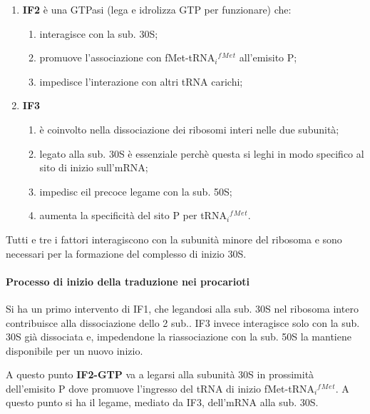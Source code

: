 \documentclass[]{article}
\begin{document}
\begin{enumerate}
\def\labelenumi{\arabic{enumi}.}
\setcounter{enumi}{1}
\itemsep1pt\parskip0pt
\item
  \textbf{IF2} è una GTPasi (lega e idrolizza GTP per funzionare) che:

  \begin{enumerate}
  \def\labelenumii{\arabic{enumii}.}
  \itemsep1pt\parskip0pt
  \item
    interagisce con la sub. 30S;
  \item
    promuove l'associazione con fMet-tRNA\(_i\)\(^f\)\(^M\)\(^e\)\(^t\)
    all'emisito P;
  \item
    impedisce l'interazione con altri tRNA carichi;
  \end{enumerate}
\item
  \textbf{IF3}

  \begin{enumerate}
  \def\labelenumii{\arabic{enumii}.}
  \itemsep1pt\parskip0pt
  \item
    è coinvolto nella dissociazione dei ribosomi interi nelle due
    subunità;
  \item
    legato alla sub. 30S è essenziale perchè questa si leghi in modo
    specifico al sito di inizio sull'mRNA;
  \item
    impedisc eil precoce legame con la sub. 50S;
  \item
    aumenta la specificità del sito P per
    tRNA\(_i\)\(^f\)\(^M\)\(^e\)\(^t\).
  \end{enumerate}
\end{enumerate}

Tutti e tre i fattori interagiscono con la subunità minore del ribosoma
e sono necessari per la formazione del complesso di inizio 30S.

\paragraph{Processo di inizio della traduzione nei
procarioti}\label{processo-di-inizio-della-traduzione-nei-procarioti}

Si ha un primo intervento di IF1, che legandosi alla sub. 30S nel
ribosoma intero contribuisce alla dissociazione dello 2 sub.. IF3 invece
interagisce solo con la sub. 30S già dissociata e, impedendone la
riassociazione con la sub. 50S la mantiene disponibile per un nuovo
inizio.

A questo punto \textbf{IF2-GTP} va a legarsi alla subunità 30S in
prossimità dell'emisito P dove promuove l'ingresso del tRNA di inizio
fMet-tRNA\(_i\)\(^f\)\(^M\)\(^e\)\(^t\). A questo punto si ha il legame,
mediato da IF3, dell'mRNA alla sub. 30S.
\end{document}
